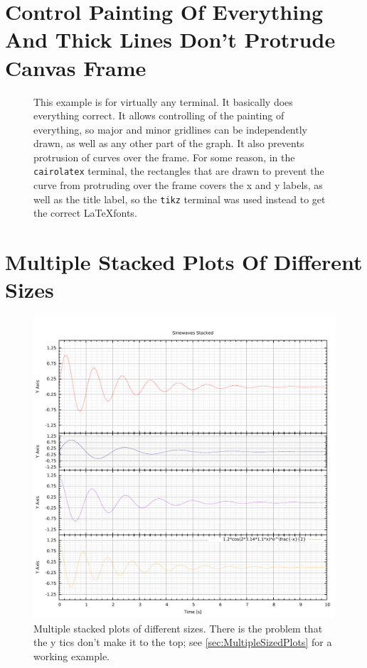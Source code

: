 \documentclass[10pt,a4paper,final]{report}
\begin{document}
\section{Control Painting Of Everything And Thick Lines Don't Protrude Canvas Frame}
\begin{figure}[htbp]
\begin{center}
\resizebox{\columnwidth}{!}{}
\caption{This example is for virtually any terminal.  It basically does everything correct.  It allows controlling of the painting of everything, so major and minor gridlines can be independently drawn, as well as any other part of the graph.  It also prevents protrusion of curves over the frame.  For some reason, in the \texttt{cairolatex} terminal, the rectangles that are drawn to prevent the curve from protruding over the frame covers the x and y labels, as well as the title label, so the \texttt{tikz} terminal was used instead to get the correct \LaTeX fonts.}
\label{fig:MosfetClassAbPowerFixed}
\end{center}
\end{figure}


\section{Multiple Stacked Plots Of Different Sizes}
\begin{figure}[!hbtp]
\centering
\includegraphics[width=\textwidth]{../Code/MultipleStackedPlots/MultipleStackedPlots.pdf}
\caption{Multiple stacked plots of different sizes.  There is the problem that the y tics don't make it to the top; see \autoref{sec:MultipleSizedPlots} for a working example.}
\end{figure}

\end{document}
